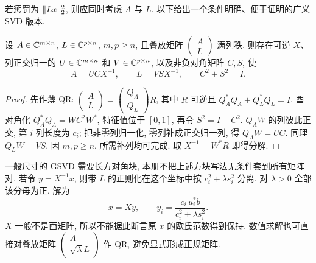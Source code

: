 若惩罚为 $\lVert Lx\rVert_2^2$, 则应同时考虑 $A$ 与 $L$. 以下给出一个条件明确、便于证明的广义 SVD 版本.
\begin{theorem}[矩阵对的广义分解]
设 $A\in\mathbb C^{m\times n}$, $L\in\mathbb C^{p\times n}$, $m,p\ge n$, 且叠放矩阵 $\begin{pmatrix}A\\L\end{pmatrix}$ 满列秩. 则存在可逆 $X$、列正交归一的 $U\in\mathbb C^{m\times n}$ 和 $V\in\mathbb C^{p\times n}$, 以及非负对角矩阵 $C,S$, 使
\[
A=UCX^{-1},\qquad L=VSX^{-1},\qquad C^2+S^2=I.
\]
\end{theorem}
\begin{proof}
先作薄 QR: $\begin{pmatrix}A\\L\end{pmatrix}=\begin{pmatrix}Q_A\\Q_L\end{pmatrix}R$, 其中 $R$ 可逆且 $Q_A^*Q_A+Q_L^*Q_L=I$. 酉对角化 $Q_A^*Q_A=W C^2W^*$, 特征值位于 $[0,1]$, 再令 $S^2=I-C^2$. $Q_AW$ 的列彼此正交, 第 $i$ 列长度为 $c_i$; 把非零列归一化, 零列补成正交归一列, 得 $Q_AW=UC$. 同理 $Q_LW=VS$. 因 $m,p\ge n$, 所需补列均可完成. 取 $X^{-1}=W^*R$ 即得分解.
\end{proof}
一般尺寸的 GSVD 需要长方对角块, 本册不把上述方块写法无条件套到所有矩阵对. 若令 $y=X^{-1}x$, 则带 $L$ 的正则化在这个坐标中按 $c_i^2+\lambda s_i^2$ 分离. 对 $\lambda>0$ 全部该分母为正, 解为
\[
x=Xy,\qquad y_i=\frac{c_i\,u_i^*b}{c_i^2+\lambda s_i^2}.
\]
$X$ 一般不是酉矩阵, 所以不能据此断言原 $x$ 的欧氏范数得到保持. 数值求解也可直接对叠放矩阵 $\begin{pmatrix}A\\\sqrt\lambda L\end{pmatrix}$ 作 QR, 避免显式形成正规矩阵.

